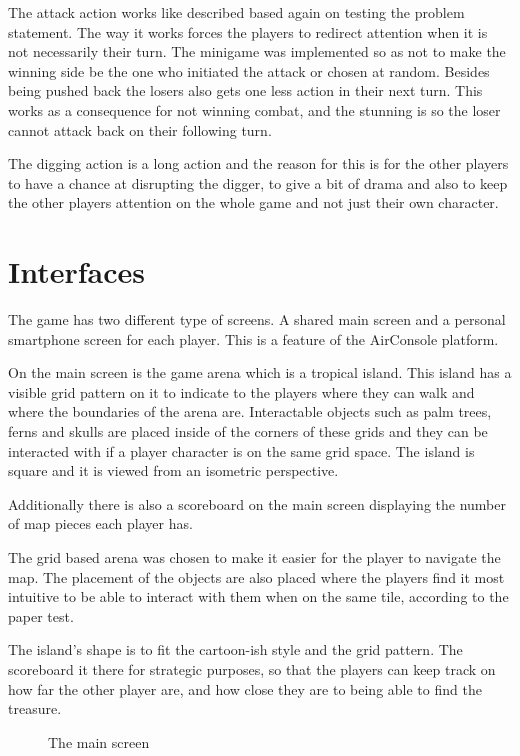 The attack action works like described based again on testing the problem statement. The way it works forces the players to redirect attention when it is not necessarily their turn. The minigame was implemented so as not to make the winning side be the one who initiated the attack or chosen at random. Besides being pushed back the losers also gets one less action in their next turn. This works as a consequence for not winning combat, and the stunning is so the loser cannot attack back on their following turn. 

The digging action is a long action and the reason for this is for the other players to have a chance at disrupting the digger, to give a bit of drama and also to keep the other players attention on the whole game and not just their own character. 

\section{Interfaces}
The game has two different type of screens. A shared main screen and a personal smartphone screen for each player. This is a feature of the AirConsole platform.

On the main screen is the game arena which is a tropical island. This island has a visible grid pattern on it to indicate to the players where they can walk and where the boundaries of the arena are. Interactable objects such as palm trees, ferns and skulls are placed inside of the corners of these grids and they can be interacted with if a player character is on the same grid space. The island is square and it is viewed from an isometric perspective. 

Additionally there is also a scoreboard on the main screen displaying the number of map pieces each player has.

The grid based arena was chosen to make it easier for the player to navigate the map. The placement of the objects are also placed where the players find it most intuitive to be able to interact with them when on the same tile, according to the paper test. 

The island’s shape is to fit the cartoon-ish style and the grid pattern. The scoreboard it there for strategic purposes, so that the players can keep track on how far the other player are, and how close they are to being able to find the treasure. 

\begin{figure}
	\centering
	\caption{The main screen}\label{fig:main_screen}
\end{figure}

